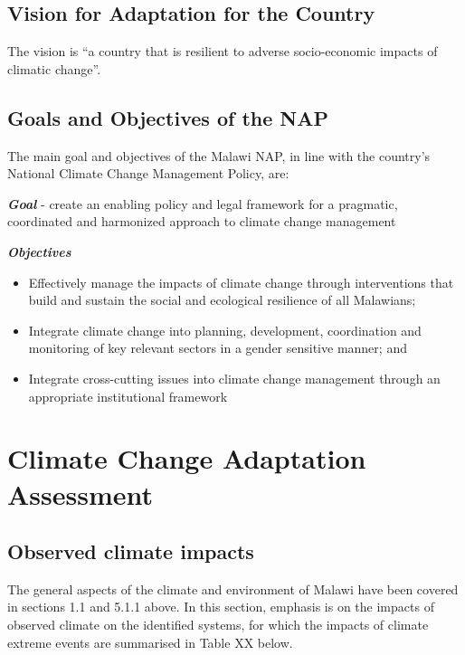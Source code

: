 \documentclass[
]{book}
\begin{document}
\hypertarget{vision-for-adaptation-for-the-country}{%
\section{Vision for Adaptation for the Country}\label{vision-for-adaptation-for-the-country}}

The vision is ``a country that is resilient to adverse socio-economic impacts of climatic change''.

\hypertarget{goals-and-objectives-of-the-nap}{%
\section{Goals and Objectives of the NAP}\label{goals-and-objectives-of-the-nap}}

The main goal and objectives of the Malawi NAP, in line with the country's National Climate Change Management Policy, are:

\textbf{\emph{Goal}}
- create an enabling policy and legal framework for a pragmatic, coordinated and harmonized approach to climate change management

\textbf{\emph{Objectives}}

\begin{itemize}
\item
  Effectively manage the impacts of climate change through interventions that build and sustain the social and ecological resilience of all Malawians;
\item
  Integrate climate change into planning, development, coordination and monitoring of key relevant sectors in a gender sensitive manner; and
\item
  Integrate cross-cutting issues into climate change management through an appropriate institutional framework
\end{itemize}

\hypertarget{climate-change-adaptation-assessment}{%
\chapter{Climate Change Adaptation Assessment}\label{climate-change-adaptation-assessment}}

\hypertarget{observed-climate-impacts}{%
\section{Observed climate impacts}\label{observed-climate-impacts}}

The general aspects of the climate and environment of Malawi have been covered in sections 1.1 and 5.1.1 above. In this section, emphasis is on the impacts of
observed climate on the identified systems, for which the impacts of climate extreme events are summarised in Table XX below.
\end{document}
